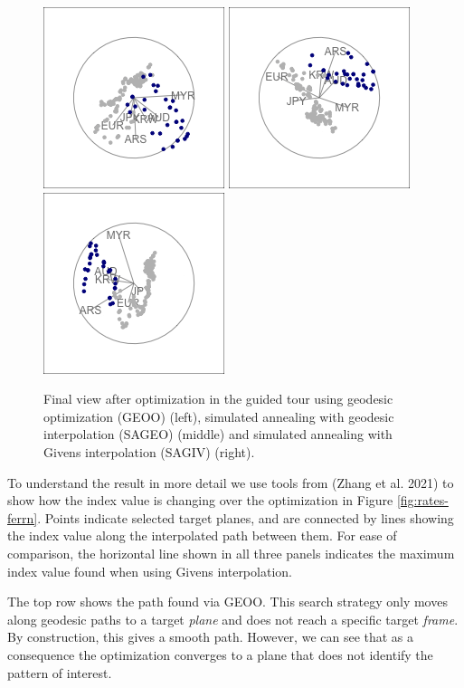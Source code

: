 \begin{figure}

{\centering \includegraphics[width=0.3\linewidth]{figures/rates_tour_geodesic_final} \includegraphics[width=0.3\linewidth]{figures/rates_tour_better_final} \includegraphics[width=0.3\linewidth]{figures/rates_tour_givens_final} 

}

\caption{Final view after optimization in the guided tour using geodesic optimization  (GEOO) (left), simulated annealing with geodesic interpolation (SAGEO) (middle) and simulated annealing with Givens interpolation (SAGIV) (right).}\label{fig:rates-tour-static}
\end{figure}

To understand the result in more detail we use tools from  (Zhang et al. 2021) to show how the index value is changing over the optimization in Figure \ref{fig:rates-ferrn}. Points indicate selected target planes, and are connected by lines showing the index value along the interpolated path between them. For ease of comparison, the horizontal line shown in all three panels indicates the maximum index value found when using Givens interpolation.

The top row shows the path found via GEOO. This search strategy only moves along geodesic paths to a target \emph{plane} and does not reach a specific target \emph{frame}. By construction, this gives a smooth path. However, we can see that as a consequence the optimization converges to a plane that does not identify the pattern of interest.

